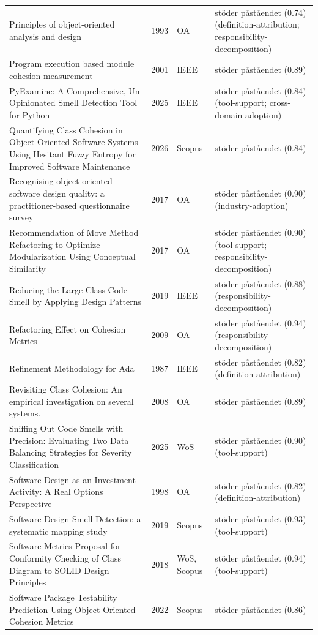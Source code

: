 \begin{longtable}{@{}%
  >{\raggedright\arraybackslash}p{}c%
  >{\raggedright\arraybackslash}p{}%
  >{\raggedright\arraybackslash}p{}@{}}
Principles of object-oriented analysis and design & 1993 & OA & stöder påståendet (0.74) (definition-attribution; responsibility-decomposition) \\
Program execution based module cohesion measurement & 2001 & IEEE & stöder påståendet (0.89) \\
PyExamine: A Comprehensive, Un-Opinionated Smell Detection Tool for Python & 2025 & IEEE & stöder påståendet (0.84) (tool-support; cross-domain-adoption) \\
Quantifying Class Cohesion in Object-Oriented Software Systems Using Hesitant Fuzzy Entropy for Improved Software Maintenance & 2026 & Scopus & stöder påståendet (0.84) \\
Recognising object-oriented software design quality: a practitioner-based questionnaire survey & 2017 & OA & stöder påståendet (0.90) (industry-adoption) \\
Recommendation of Move Method Refactoring to Optimize Modularization Using Conceptual Similarity & 2017 & OA & stöder påståendet (0.90) (tool-support; responsibility-decomposition) \\
Reducing the Large Class Code Smell by Applying Design Patterns & 2019 & IEEE & stöder påståendet (0.88) (responsibility-decomposition) \\
Refactoring Effect on Cohesion Metrics & 2009 & OA & stöder påståendet (0.94) (responsibility-decomposition) \\
Refinement Methodology for Ada & 1987 & IEEE & stöder påståendet (0.82) (definition-attribution) \\
Revisiting Class Cohesion: An empirical investigation on several systems. & 2008 & OA & stöder påståendet (0.89) \\
Sniffing Out Code Smells with Precision: Evaluating Two Data Balancing Strategies for Severity Classification & 2025 & WoS & stöder påståendet (0.90) (tool-support) \\
Software Design as an Investment Activity: A Real Options Perspective & 1998 & OA & stöder påståendet (0.82) (definition-attribution) \\
Software Design Smell Detection: a systematic mapping study & 2019 & Scopus & stöder påståendet (0.93) (tool-support) \\
Software Metrics Proposal for Conformity Checking of Class Diagram to SOLID Design Principles & 2018 & WoS, Scopus & stöder påståendet (0.94) (tool-support) \\
Software Package Testability Prediction Using Object-Oriented Cohesion Metrics & 2022 & Scopus & stöder påståendet (0.86) \\

\end{longtable}
